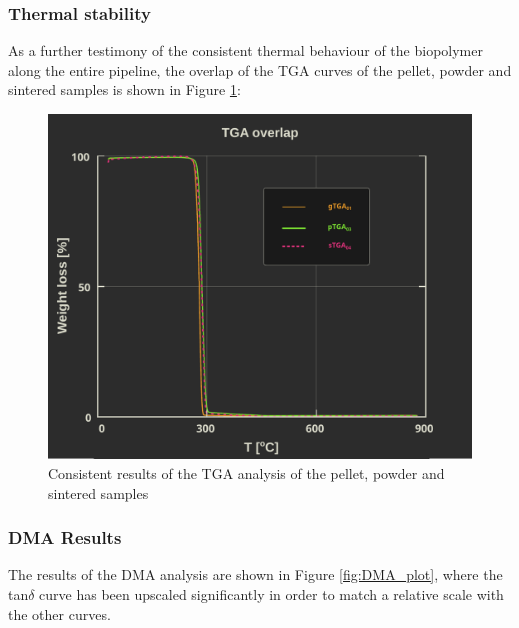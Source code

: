 \documentclass[a4paper]{article}
\begin{document}
        \subsubsection{Thermal stability\label{thermal_stability}}

        As a further testimony of the consistent thermal behaviour of the biopolymer along the entire pipeline, the overlap of the
        TGA curves of the pellet, powder and sintered samples is shown in Figure \ref{fig:TGA_overlapped}:
        \begin{figure}[H]
            \centering
            \includegraphics[width=\textwidth]{Pictures/Thermal_analysis_plots/TGA_catalogued/Fixed/TGA_overlapped.pdf}
            \caption{Consistent results of the TGA analysis of the pellet, powder and sintered samples}
            \label{fig:TGA_overlapped}
        \end{figure}

        \clearpage

        \subsubsection{DMA Results\label{DMA_Results}}

        The results of the DMA analysis are shown in Figure \ref{fig:DMA_plot}, where the tan$\delta$ curve has been upscaled significantly 
        in order to match a relative scale with the other curves. \\ 
\end{document}
